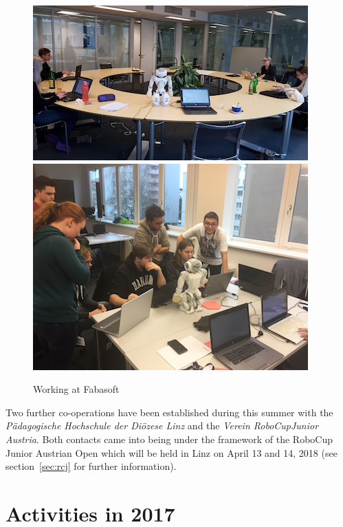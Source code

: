 \documentclass[11pt]{article}
\begin{document}
\begin{figure}
\begin{center}
\includegraphics[scale=.574]{img/Fabasoft1.png}
\includegraphics[scale=0.43]{img/Fabasoft2.png}
\end{center}
\caption{Working at Fabasoft}
\label{fig:fabasoft}
\end{figure}

Two further co-operations have been established during this summer with the \foreignlanguage{german}{{\em Pä\-da\-gogische Hochschule der Diözese Linz}} and the {\em Verein RoboCupJunior Austria}. Both contacts came into being under the framework of the RoboCup Junior Austrian Open which will be held in Linz on April 13 and 14, 2018 (see section~\ref{sec:rcj} for further information).

\section{Activities in 2017}
\end{document}
